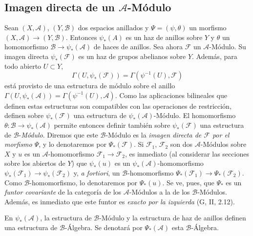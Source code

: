 \subsection{Imagen directa de un $\mathcal{A}$-Módulo}
\label{subsection:0.4.2-fr}

\begin{env}[4.2.1]
\label{0.4.2.1-fr}
Sean $(X,\mathcal{A})$, $(Y,\mathcal{B})$ dos espacios anillados y
$\Psi=(\psi,\theta)$ un morfismo
$(X,\mathcal{A})\to(Y,\mathcal{B})$. Entonces $\psi_*(A)$ es un
haz de anillos sobre $Y$ y $\theta$ un homomorfismo
$\mathcal{B}\to\psi_*(\mathcal{A})$ de haces de anillos. Sea ahora
$\mathcal{F}$ un $\mathcal{A}$-Módulo. Su imagen directa
$\psi_*(\mathcal{F})$ es un haz de grupos abelianos sobre $Y$. Además,
para todo abierto $U\subset Y$,
\[
  \Gamma(U,\psi_*(\mathcal{F}))
  =\Gamma(\psi^{-1}(U),\mathcal{F})
\]
está provisto de una estructura de módulo sobre el anillo
$\Gamma(U,\psi_*(\mathcal{A}))=\Gamma(\psi^{-1}(U),\mathcal{A})$.
Como las aplicaciones bilineales que definen estas estructuras son
compatibles con las operaciones de restricción, definen sobre
$\psi_*(\mathcal{F})$ una estructura de $\psi_*(\mathcal{A})$-Módulo.
El homomorfismo $\theta:\mathcal{B}\to\psi_*(\mathcal{A})$ permite entonces
definir también sobre $\psi_*(\mathcal{F})$ una estructura de
$\mathcal{B}$-\emph{Módulo}. Diremos que este $\mathcal{B}$-Módulo es la
\emph{imagen directa de $\mathcal{F}$ por el morfismo $\Psi$}, y lo
denotaremos por $\Psi_*(\mathcal{F})$. Si $\mathcal{F}_1$, $\mathcal{F}_2$
son dos $\mathcal{A}$-Módulos sobre $X$ y $u$ es un
$\mathcal{A}$-homomorfismo $\mathcal{F}_1\to\mathcal{F}_2$, es inmediato
(al considerar las secciones sobre los abiertos de $Y$) que $\psi_*(u)$
es un $\psi_*(\mathcal{A})$-homomorfismo
$\psi_*(\mathcal{F}_1)\to\psi_*(\mathcal{F}_2)$ y, \emph{a fortiori}, un
$\mathcal{B}$-homomorfismo
$\Psi_*(\mathcal{F}_1)\to\Psi_*(\mathcal{F}_2)$. Como
$\mathcal{B}$-homomorfismo, lo denotaremos por $\Psi_*(u)$. Se ve, pues, que
$\Psi_*$ es un \emph{funtor covariante} de la categoría de los
$\mathcal{A}$-Módulos a la de los $\mathcal{B}$-Módulos. Además, es
inmediato que este funtor es \emph{exacto por la izquierda} (G, II, 2.12).

En $\psi_*(\mathcal{A})$, la estructura de $\mathcal{B}$-Módulo y la
estructura de haz de anillos definen una estructura de
$\mathcal{B}$-Álgebra. Se denotará por $\Psi_*(\mathcal{A})$ esta
$\mathcal{B}$-Álgebra.
\end{env}
